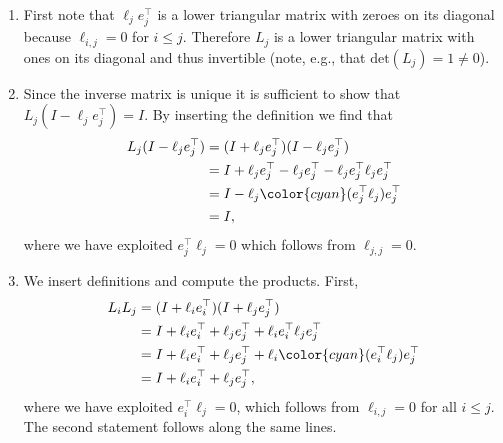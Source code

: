 {
\color{solution}
\begin{enumerate}
	\item First note that $\ell_je_j^\top$ is a lower triangular matrix with zeroes on its diagonal because $\ell_{i,j} = 0$ for $i\leq j$. Therefore $L_j$ is a lower triangular matrix with ones on its diagonal and thus invertible (note, e.g., that $\text{det}(L_j) = 1 \neq 0$). 
	\item Since the inverse matrix is unique it is sufficient to show that $L_j (I - \ell_je_j^\top ) = I$. By inserting the definition we find that
	\begin{align*}
	L_j (I - \ell_je_j^\top )  & = (I + \ell_je_j^\top ) (I - \ell_je_j^\top )\\
	&=I + \ell_je_j^\top  - \ell_je_j^\top - \ell_je_j^\top \ell_je_j^\top \\
	&=I - \ell_j{\color{cyan}(e_j^\top \ell_j)}e_j^\top \\
	&=I,
	\end{align*}
	where we have exploited $e_j^\top \ell_j= 0$ which follows from $\ell_{j,j} = 0$.
	\item We insert definitions and compute the products. First,
		\begin{align*}
	L_i L_j  & = (I + \ell_ie_i^\top ) (I + \ell_je_j^\top )\\
	&=I + \ell_ie_i^\top  + \ell_je_j^\top+ \ell_ie_i^\top \ell_je_j^\top \\
	&=I + \ell_ie_i^\top  + \ell_je_j^\top+ \ell_i{\color{cyan}(e_i^\top \ell_j)}e_j^\top \\
	&=I + \ell_ie_i^\top  + \ell_je_j^\top,
	\end{align*}
	where we have exploited $e_i^\top \ell_j=0$, which follows from $\ell_{i,j} = 0$ for all $i \leq j$. The second statement follows along the same lines.
\end{enumerate}
}
